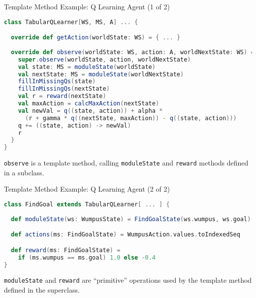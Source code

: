 \documentclass{beamer}
\begin{document}
\begin{frame}[fragile]{Template Method Example: Q Learning Agent (1 of 2)}


\begin{lstlisting}[language=Scala]
class TabularQLearner[WS, MS, A] ... {

  override def getAction(worldState: WS) = { ... }
  
  override def observe(worldState: WS, action: A, worldNextState: WS) = {
    super.observe(worldState, action, worldNextState)
    val state: MS = moduleState(worldState)
    val nextState: MS = moduleState(worldNextState)
    fillInMissingQs(state)
    fillInMissingQs(nextState)
    val r = reward(nextState)
    val maxAction = calcMaxAction(nextState)
    val newVal = q((state, action)) + alpha *
      (r + gamma * q((nextState, maxAction)) - q((state, action)))
    q += ((state, action) -> newVal)
    r
  }
}
\end{lstlisting}

{\tt observe} is a template method, calling {\tt moduleState} and  {\tt reward} methods defined in a subclass.

\end{frame}

\begin{frame}[fragile]{Template Method Example: Q Learning Agent (2 of 2)}


\begin{lstlisting}[language=Scala]
class FindGoal extends TabularQLearner[ ... ] {
  
  def moduleState(ws: WumpusState) = FindGoalState(ws.wumpus, ws.goal)

  def actions(ms: FindGoalState) = WumpusAction.values.toIndexedSeq

  def reward(ms: FindGoalState) = 
    if (ms.wumpus == ms.goal) 1.0 else -0.4
}
\end{lstlisting}

{\tt moduleState} and {\tt reward} are ``primitive'' operations used by the template method defined in the superclass.

\end{frame}










\end{document}
